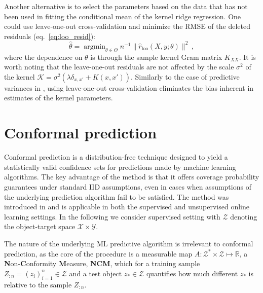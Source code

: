 \documentclass{ITaSconf}
\newcommand{\Kcal}{\mathcal{K}}
\newcommand{\Xcal}{\mathcal{X}}
\newcommand{\Ycal}{\mathcal{Y}}
\newcommand{\Zcal}{\mathcal{Z}}
\newcommand{\Real}{\mathbb{R}}
\begin{document}
Another alternative is to select the parameters based on the data that has not been
used in fitting the conditional mean of the kernel ridge regression. One could use
leave-one-out cross-validation and minimize the RMSE of the deleted residuals
(eq.~\ref{eq:loo_resid}):
\begin{equation}
  \hat{\theta}
    = \mathop{\text{argmin}}_{\theta \in\Theta}
      n^{-1} \| \hat{r}_{\text{loo}}(X, y; \theta) \|^2
    \,,
\end{equation}
where the dependence on $\theta$ is through the sample kernel Gram matrix $K_{XX}$.
It is worth noting that the leave-one-out residuals are not affected by the scale
$\sigma^2$ of the kernel $\Kcal = \sigma^2(\lambda \delta_{x,x'} + K(x, x'))$.
Similarly to the case of predictive variances in \cite{pcw20005a7}, using leave-one-out
cross-validation eliminates the bias inherent in estimates of the kernel parameters.



\section{Conformal prediction} %
\label{sec:conformal_prediction}

Conformal prediction is a distribution-free technique designed to yield a statistically
valid confidence sets for predictions made by machine learning algorithms. The key
advantage of the method is that it offers coverage probability guarantees under standard
IID assumptions, even in cases when assumptions of the underlying prediction algorithm
fail to be satisfied. The method was introduced in \cite{vovk2005} and is applicable
in both the supervised and unsupervised online learning settings. In the following
we consider supervised setting with $\Zcal$ denoting the object-target space $\Xcal \times \Ycal$.

The nature of the underlying ML predictive algorithm is irrelevant to conformal
prediction, as the core of the procedure is a measurable map $A: \Zcal^*\times \Zcal \mapsto \Real$,
a \textbf{N}on-\textbf{C}onformity \textbf{M}easure, \textbf{NCM}, which for a training
sample $Z_{:n}=(z_i)_{i=1}^n\in\Zcal$ and a test object $z_* \in \Zcal$ quantifies
how much different $z_*$ is relative to the sample $Z_{:n}$.
\end{document}
